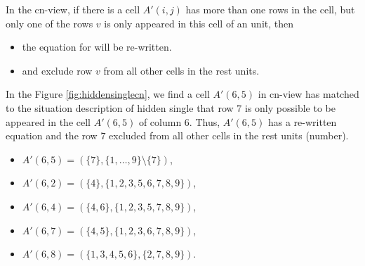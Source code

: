 \documentclass[11pt]{report}
\newcommand{\set}[1]{\{ #1 \}}
\begin{document}
In the cn-view, if there is a cell $A'(i,j)$ has more than one rows in the cell, but only one of the rows $v$ is only appeared in this cell of an unit, then
\begin{itemize}
\item the equation for will be re-written.
\item and exclude row $v$ from all other cells in the rest units.
\end{itemize}
In the Figure \ref{fig:hiddensinglecn}, we find a cell $A'(6,5)$ in cn-view has matched to the situation description of hidden single that row $7$ is only possible to be appeared in the cell $A'(6,5)$ of column $6$. Thus, $A'(6,5)$ has a re-written equation and the row $7$ excluded from all other cells in the rest units (number).
\begin{itemize}
\item $A'(6,5) = (\set{7}, \set{1,\dots,9} \setminus \set{7})$,
\item $A'(6,2) = (\set{4}, \set{1, 2, 3, 5, 6, 7, 8, 9})$,
\item $A'(6,4) = (\set{4, 6}, \set{1, 2, 3, 5, 7, 8, 9})$,
\item $A'(6,7) = (\set{4, 5}, \set{1, 2, 3, 6, 7, 8, 9})$,
\item $A'(6,8) = (\set{1, 3, 4, 5, 6}, \set{2, 7, 8, 9})$.
\end{itemize}
\end{document}
